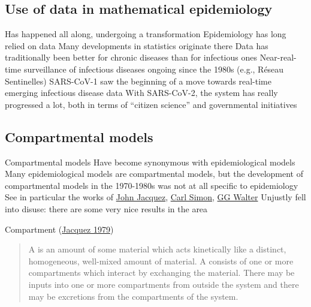 \documentclass[aspectratio=169]{beamer}\usepackage[]{graphicx}\usepackage[]{xcolor}
\begin{document}
\subsection{Use of data in mathematical epidemiology}


\begin{frame}{Has happened all along, undergoing a transformation}
\bbullet Epidemiology has long relied on data
\vfill
\bbullet Many developments in statistics originate there
\vfill
\bbullet Data has traditionally been better for chronic diseases than for infectious ones
\vfill
\bbullet Near-real-time surveillance of infectious diseases ongoing since the 1980s (e.g., Réseau Sentinelles)
\vfill
\bbullet SARS-CoV-1 saw the beginning of a move towards real-time emerging infectious disease data
\vfill
\bbullet With SARS-CoV-2, the system has really progressed a lot, both in terms of ``citizen science'' and governmental initiatives
\end{frame}



\subsection{Compartmental models}


\begin{frame}{Compartmental models}
\bbullet Have become synonymous with epidemiological models
\vfill
\bbullet Many epidemiological models are compartmental models, but the development of compartmental models in the 1970-1980s was not at all specific to epidemiology
\vfill
\bbullet See in particular the works of \href{https://www.semanticscholar.org/author/J.-Jacquez/2321059}{John Jacquez}, \href{https://scholar.google.ca/citations?user=dv_z_mAAAAAJ}{Carl Simon}, \href{https://www.semanticscholar.org/author/G.-Walter/1799059}{GG Walter}
\vfill
\bbullet Unjustly fell into disuse: there are some very nice results in the area    
\end{frame}

\begin{frame}{Compartment (\href{https://doi-org.uml.idm.oclc.org/10.1016/B978-0-12-434180-7.50021-8}{Jacquez 1979})}

\begin{quote}
  A  is an amount of some material which acts kinetically like a distinct, homogeneous, well-mixed amount of material. A  consists of one or more compartments which interact by exchanging the material. There may be inputs into one or more compartments from outside the system and there may be excretions from the compartments of the system.   
\end{quote}
\end{frame}
\end{document}
